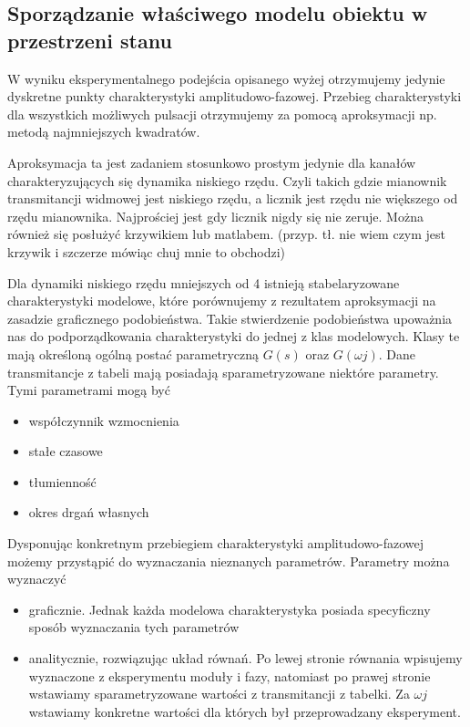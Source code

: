 \documentclass{article}
\begin{document}
	\subsection{Sporządzanie właściwego modelu obiektu w przestrzeni stanu}

		W wyniku eksperymentalnego podejścia opisanego wyżej otrzymujemy jedynie dyskretne
		punkty charakterystyki amplitudowo-fazowej. Przebieg charakterystyki dla
		wszystkich możliwych pulsacji otrzymujemy za pomocą aproksymacji np.
		metodą najmniejszych kwadratów.

		Aproksymacja ta jest zadaniem stosunkowo prostym jedynie dla kanałów
		charakteryzujących się dynamika niskiego rzędu.
		Czyli takich gdzie mianownik transmitancji widmowej jest niskiego rzędu,
		a licznik jest rzędu nie większego od rzędu mianownika.
		Najprościej jest gdy licznik nigdy się nie zeruje.
		Można również się posłużyć krzywikiem lub matlabem.
		(przyp. tł. nie wiem czym jest krzywik i szczerze mówiąc chuj mnie to obchodzi)

		Dla dynamiki niskiego rzędu mniejszych od 4 istnieją stabelaryzowane charakterystyki
		modelowe, które porównujemy z rezultatem aproksymacji na zasadzie graficznego
		podobieństwa. Takie stwierdzenie podobieństwa upoważnia nas do podporządkowania
		charakterystyki do jednej z klas modelowych.
		Klasy te mają określoną ogólną postać parametryczną $G(s)$ oraz $G(\omega j)$.
		Dane transmitancje z tabeli mają posiadają sparametryzowane niektóre parametry.
		Tymi parametrami mogą być
		\begin{itemize}
			\item współczynnik wzmocnienia
			\item stałe czasowe
			\item tłumienność
			\item okres drgań własnych
		\end{itemize}
		Dysponując konkretnym przebiegiem charakterystyki amplitudowo-fazowej możemy przystąpić
		do wyznaczania nieznanych parametrów. Parametry można wyznaczyć
		\begin{itemize}
			\item graficznie. Jednak każda modelowa charakterystyka posiada specyficzny sposób wyznaczania
			tych parametrów
			\item analitycznie, rozwiązując układ równań. Po lewej stronie równania wpisujemy
			wyznaczone z eksperymentu moduły i fazy, natomiast po prawej stronie wstawiamy
			sparametryzowane wartości z transmitancji z tabelki. Za $\omega j$ wstawiamy
			konkretne wartości dla których był przeprowadzany eksperyment.
		\end{itemize}
\end{document}
